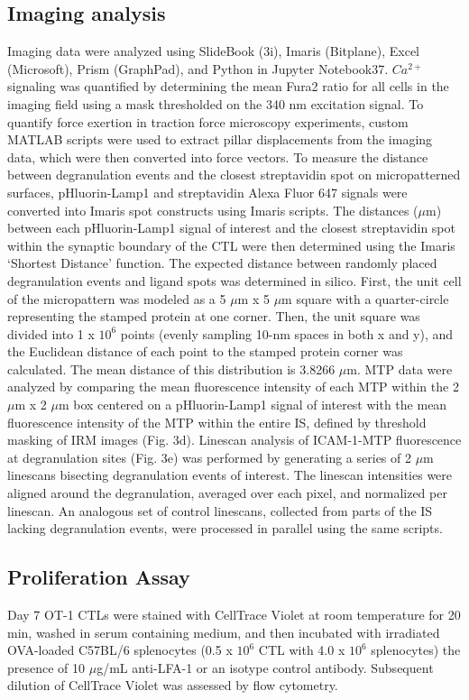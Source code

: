 \subsection{Imaging analysis}
Imaging data were analyzed using SlideBook (3i), Imaris (Bitplane), Excel (Microsoft), Prism (GraphPad), and Python in Jupyter Notebook37. $Ca^{2+}$ signaling was quantified by determining the mean Fura2 ratio for all cells in the imaging field using a mask thresholded on the 340 nm excitation signal. To quantify force exertion in traction force microscopy experiments, custom MATLAB scripts were used to extract pillar displacements from the imaging data, which were then converted into force vectors. To measure the distance between degranulation events and the closest streptavidin spot on micropatterned surfaces, pHluorin-Lamp1 and streptavidin Alexa Fluor 647 signals were converted into Imaris spot constructs using Imaris scripts. The distances ($\mu$m) between each pHluorin-Lamp1 signal of interest and the closest streptavidin spot within the synaptic boundary of the CTL were then determined using the Imaris ‘Shortest Distance’ function. The expected distance between randomly placed degranulation events and ligand spots was
determined in silico. First, the unit cell of the micropattern was modeled as a 5 $\mu$m x 5 $\mu$m square with a quarter-circle representing the stamped protein at one corner. Then, the unit square was divided into 1 x $10^{6}$ points (evenly sampling 10-nm spaces in both x and y), and the Euclidean distance of each point to the stamped protein corner was calculated. The mean distance of this distribution is 3.8266 $\mu$m. MTP data were analyzed by comparing the mean fluorescence intensity of each MTP within the 2 $\mu$m x 2 $\mu$m box centered on a pHluorin-Lamp1 signal of interest with the mean fluorescence intensity of the MTP within the entire IS, defined by threshold masking of IRM images (Fig. 3d). Linescan analysis of ICAM-1-MTP fluorescence at degranulation sites (Fig. 3e) was performed by generating a series of 2 $\mu$m linescans bisecting degranulation events of interest. The linescan intensities were aligned around the degranulation, averaged over each pixel, and normalized per linescan. An analogous set of control linescans, collected from parts of the IS lacking degranulation events, were processed in parallel using the same scripts.

\subsection{Proliferation Assay}
Day 7 OT-1 CTLs were stained with CellTrace Violet at room temperature for 20 min, washed in serum containing medium, and then incubated with irradiated OVA-loaded C57BL/6 splenocytes (0.5 x $10^{6}$ CTL with 4.0 x $10^{6}$ splenocytes) the presence of 10 $\mu$g/mL anti-LFA-1 or an isotype control antibody. Subsequent dilution of CellTrace Violet was assessed by flow cytometry.

